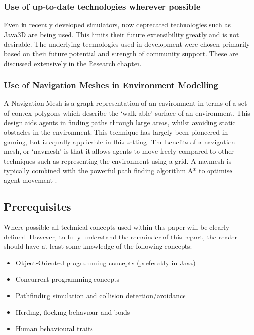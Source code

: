 \subsubsection{Use of up-to-date technologies wherever possible}
Even in recently developed simulators, now deprecated technologies such as Java3D are being used. This limits their future extensibility greatly and is not desirable.
The underlying technologies used in development were chosen primarily based on their future potential and strength of community support.
These are discussed extensively in the Research chapter.

\subsubsection{Use of Navigation Meshes in Environment Modelling}
A Navigation Mesh is a graph representation of an environment in terms of a set of convex polygons which describe the `walk able' surface of an environment. This design aids agents in finding paths through large areas, whilst avoiding static obstacles in the environment.
This technique has largely been pioneered in gaming, but is equally applicable in this setting. The benefits of a navigation mesh, or `navmesh' is that it allows agents to move 
freely compared to other techniques such as representing the environment using a grid. A navmesh is typically combined with the powerful path finding algorithm A* to 
optimise agent movement \cite{A*Review}.

\subsection{Prerequisites}
Where possible all technical concepts used within this paper will be clearly defined. However, to fully understand the remainder of this report, the reader should have at least
some knowledge of the following concepts:
\begin{itemize}
 \item Object-Oriented programming concepts (preferably in Java)
 \item Concurrent programming concepts
 \item Pathfinding simulation and collision detection/avoidance~\cite{gameProgramming}~\cite{collisionDetection}
 \item Herding, flocking behaviour and boids~\cite{HAndBoid}~\cite{Fbehavior}
 \item Human behavioural traits~\cite{HumanBehaviouralTraits}
\end{itemize}

